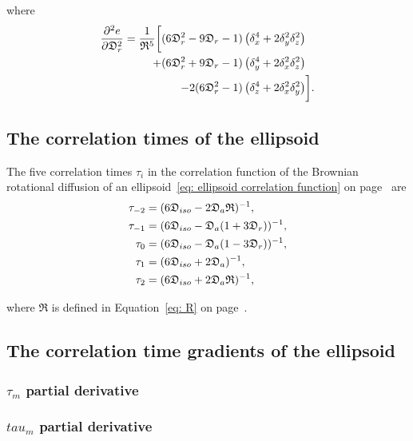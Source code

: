\noindent where
\begin{align}
    \frac{\partial^2 e}{\partial \mathfrak{D}_r^2}  =  \frac{1}{\mathfrak{R}^5} \bigg[
        (6\mathfrak{D}_r^2 - 9\mathfrak{D}_r - 1) \left(\delta_x^4 + 2\delta_y^2\delta_z^2\right) & \nonumber \\
        + (6\mathfrak{D}_r^2 + 9\mathfrak{D}_r - 1) \left(\delta_y^4 + 2\delta_x^2\delta_z^2\right) & \nonumber \\
        - 2 (6\mathfrak{D}_r^2 - 1) \left(\delta_z^4 + 2\delta_x^2\delta_y^2\right) & \bigg].
\end{align}




\newpage
\subsection{The correlation times of the ellipsoid}

The five correlation times $\tau_i$ in the correlation function of the Brownian rotational diffusion of an ellipsoid~\eqref{eq: ellipsoid correlation function} on page~\pageref{eq: ellipsoid correlation function} are
\begin{subequations}
\begin{align}
    \tau_{-2} &= (6\mathfrak{D}_{iso} - 2\mathfrak{D}_a\mathfrak{R})^{-1}, \\
    \tau_{-1} &= (6\mathfrak{D}_{iso} - \mathfrak{D}_a (1 + 3\mathfrak{D}_r))^{-1}, \\
    \tau_{0}  &= (6\mathfrak{D}_{iso} - \mathfrak{D}_a (1 - 3\mathfrak{D}_r))^{-1}, \\
    \tau_{1}  &= (6\mathfrak{D}_{iso} + 2\mathfrak{D}_a)^{-1}, \\
    \tau_{2}  &= (6\mathfrak{D}_{iso} + 2\mathfrak{D}_a\mathfrak{R})^{-1},
\end{align}
\end{subequations}

\noindent where $\mathfrak{R}$ is defined in Equation~\eqref{eq: R} on page~\pageref{eq: R}.




\subsection{The correlation time gradients of the ellipsoid}


\begin{latexonly}
    \subsubsection{$\tau_m$ partial derivative}
\end{latexonly}
\begin{htmlonly}
    \subsubsection{$tau_m$ partial derivative}
\end{htmlonly}

